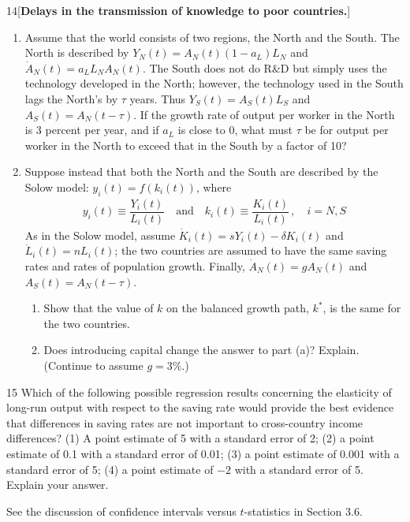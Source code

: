 \begin{problem}{14}[\textbf{Delays in the transmission of knowledge to poor countries.}]
\begin{enumerate}[label=(\alph*)]
    \item Assume that the world consists of two regions, the North and the South. The North is described by \(Y_N\left(t\right)=A_N\left(t\right)\left(1-a_L\right)L_N\) and \(\dot{A}_N\left(t\right)=a_LL_NA_N\left(t\right)\). The South does not do R\&D but simply uses the technology developed in the North; however, the technology used in the South lags the North's by \(\tau\) years. Thus \(Y_S\left(t\right)=A_S\left(t\right)L_S\) and \(A_S\left(t\right)=A_N\left(t-\tau\right)\). If the growth rate of output per worker in the North is 3 percent per year, and if \(a_L\) is close to 0, what must \(\tau\) be for output per worker in the North to exceed that in the South by a factor of 10?
    \item Suppose instead that both the North and the South are described by the Solow model: \(y_i\left(t\right)=f\left(k_i\left(t\right)\right)\), where 
    \begin{align*}
        y_i\left(t\right) \equiv \dfrac{Y_i\left(t\right)}{L_i\left(t\right)} \quad \text{and} \quad k_i\left(t\right)\equiv \dfrac{K_i\left(t\right)}{L_i\left(t\right)}\,,\quad i=N,S
    \end{align*}
    As in the Solow model, assume \(\dot{K}_i\left(t\right)=sY_i\left(t\right)-\delta K_i\left(t\right)\) and \(\dot{L}_i\left(t\right)=nL_i\left(t\right)\); the two countries are assumed to have the same saving rates and rates of population growth. Finally, \(\dot{A}_N\left(t\right)=gA_N\left(t\right)\) and \(A_S\left(t\right)=A_N\left(t-\tau\right)\).
    \begin{enumerate}[label=(\roman*)]
        \item Show that the value of \(k\) on the balanced growth path, \(k^*\), is the same for the two countries.
        \item Does introducing capital change the answer to part (a)? Explain. (Continue to assume \(g=3\%\).)
    \end{enumerate}
\end{enumerate}
\end{problem}

\begin{problem}{15}
Which of the following possible regression results concerning the elasticity of long-run output with respect to the saving rate would provide the best evidence that differences in saving rates are not important to cross-country income differences? (1) A point estimate of 5 with a standard error of 2; (2) a point estimate of 0.1 with a standard error of 0.01; (3) a point estimate of 0.001 with a standard error of 5; (4) a point estimate of \(-2\) with a standard error of 5. Explain your answer.
\par {} See the discussion of confidence intervals versus \(t\)-statistics in Section 3.6.
\end{problem}

